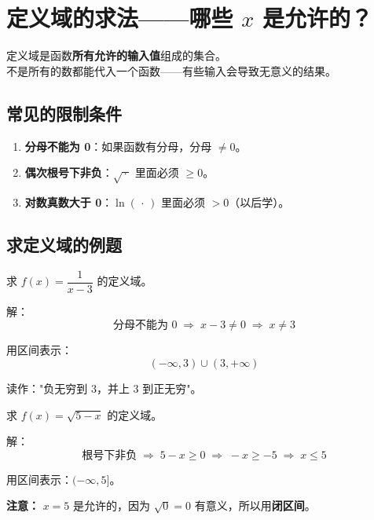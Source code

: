 \section{定义域的求法——哪些 \(x\) 是允许的？}

定义域是函数\textbf{所有允许的输入值}组成的集合。\\
不是所有的数都能代入一个函数——有些输入会导致无意义的结果。

\subsection{常见的限制条件}

\begin{definitionbox}[定义域的常见限制]
\begin{enumerate}
  \item \textbf{分母不能为 0}：如果函数有分母，分母 \(\neq 0\)。
  \item \textbf{偶次根号下非负}：\(\sqrt{\,\cdot\,}\) 里面必须 \(\ge 0\)。
  \item \textbf{对数真数大于 0}：\(\ln(\,\cdot\,)\) 里面必须 \(> 0\)（以后学）。
\end{enumerate}
\end{definitionbox}

\subsection{求定义域的例题}

\begin{examplebox}[8]
求 \(f(x) = \dfrac{1}{x - 3}\) 的定义域。

解：
\[
\mbox{分母不能为 0} \;\Longrightarrow\; x - 3 \neq 0 \;\Longrightarrow\; x \neq 3
\]

用区间表示：
\[
(-\infty, 3) \cup (3, +\infty)
\]

读作："负无穷到 3，并上 3 到正无穷"。
\end{examplebox}

\begin{examplebox}[9]
求 \(f(x) = \sqrt{5 - x}\) 的定义域。

解：
\[
\mbox{根号下非负} \;\Longrightarrow\; 5 - x \ge 0 \;\Longrightarrow\; -x \ge -5 \;\Longrightarrow\; x \le 5
\]

用区间表示：\((-\infty, 5]\)。

\textbf{注意：} \(x = 5\) 是允许的，因为 \(\sqrt{0} = 0\) 有意义，所以用\textbf{闭区间}。
\end{examplebox}

